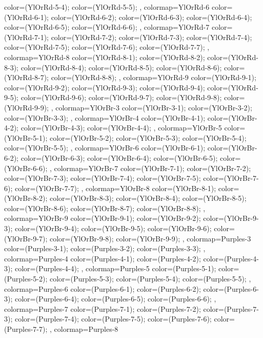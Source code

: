 {{  color=(YlOrRd-5-4);
  color=(YlOrRd-5-5);
},
colormap={YlOrRd-6}{
  color=(YlOrRd-6-1);
  color=(YlOrRd-6-2);
  color=(YlOrRd-6-3);
  color=(YlOrRd-6-4);
  color=(YlOrRd-6-5);
  color=(YlOrRd-6-6);
},
colormap={YlOrRd-7}{
  color=(YlOrRd-7-1);
  color=(YlOrRd-7-2);
  color=(YlOrRd-7-3);
  color=(YlOrRd-7-4);
  color=(YlOrRd-7-5);
  color=(YlOrRd-7-6);
  color=(YlOrRd-7-7);
},
colormap={YlOrRd-8}{
  color=(YlOrRd-8-1);
  color=(YlOrRd-8-2);
  color=(YlOrRd-8-3);
  color=(YlOrRd-8-4);
  color=(YlOrRd-8-5);
  color=(YlOrRd-8-6);
  color=(YlOrRd-8-7);
  color=(YlOrRd-8-8);
},
colormap={YlOrRd-9}{
  color=(YlOrRd-9-1);
  color=(YlOrRd-9-2);
  color=(YlOrRd-9-3);
  color=(YlOrRd-9-4);
  color=(YlOrRd-9-5);
  color=(YlOrRd-9-6);
  color=(YlOrRd-9-7);
  color=(YlOrRd-9-8);
  color=(YlOrRd-9-9);
},
colormap={YlOrBr-3}{
  color=(YlOrBr-3-1);
  color=(YlOrBr-3-2);
  color=(YlOrBr-3-3);
},
colormap={YlOrBr-4}{
  color=(YlOrBr-4-1);
  color=(YlOrBr-4-2);
  color=(YlOrBr-4-3);
  color=(YlOrBr-4-4);
},
colormap={YlOrBr-5}{
  color=(YlOrBr-5-1);
  color=(YlOrBr-5-2);
  color=(YlOrBr-5-3);
  color=(YlOrBr-5-4);
  color=(YlOrBr-5-5);
},
colormap={YlOrBr-6}{
  color=(YlOrBr-6-1);
  color=(YlOrBr-6-2);
  color=(YlOrBr-6-3);
  color=(YlOrBr-6-4);
  color=(YlOrBr-6-5);
  color=(YlOrBr-6-6);
},
colormap={YlOrBr-7}{
  color=(YlOrBr-7-1);
  color=(YlOrBr-7-2);
  color=(YlOrBr-7-3);
  color=(YlOrBr-7-4);
  color=(YlOrBr-7-5);
  color=(YlOrBr-7-6);
  color=(YlOrBr-7-7);
},
colormap={YlOrBr-8}{
  color=(YlOrBr-8-1);
  color=(YlOrBr-8-2);
  color=(YlOrBr-8-3);
  color=(YlOrBr-8-4);
  color=(YlOrBr-8-5);
  color=(YlOrBr-8-6);
  color=(YlOrBr-8-7);
  color=(YlOrBr-8-8);
},
colormap={YlOrBr-9}{
  color=(YlOrBr-9-1);
  color=(YlOrBr-9-2);
  color=(YlOrBr-9-3);
  color=(YlOrBr-9-4);
  color=(YlOrBr-9-5);
  color=(YlOrBr-9-6);
  color=(YlOrBr-9-7);
  color=(YlOrBr-9-8);
  color=(YlOrBr-9-9);
},
colormap={Purples-3}{
  color=(Purples-3-1);
  color=(Purples-3-2);
  color=(Purples-3-3);
},
colormap={Purples-4}{
  color=(Purples-4-1);
  color=(Purples-4-2);
  color=(Purples-4-3);
  color=(Purples-4-4);
},
colormap={Purples-5}{
  color=(Purples-5-1);
  color=(Purples-5-2);
  color=(Purples-5-3);
  color=(Purples-5-4);
  color=(Purples-5-5);
},
colormap={Purples-6}{
  color=(Purples-6-1);
  color=(Purples-6-2);
  color=(Purples-6-3);
  color=(Purples-6-4);
  color=(Purples-6-5);
  color=(Purples-6-6);
},
colormap={Purples-7}{
  color=(Purples-7-1);
  color=(Purples-7-2);
  color=(Purples-7-3);
  color=(Purples-7-4);
  color=(Purples-7-5);
  color=(Purples-7-6);
  color=(Purples-7-7);
},
colormap={Purples-8}{
}}
